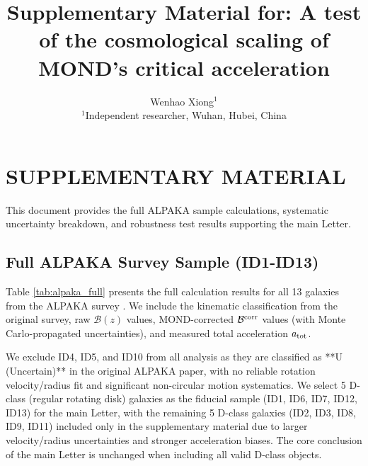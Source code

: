 \documentclass[fleqn,usenatbib]{mnras}
\title[Supplementary Material]
{Supplementary Material for: A test of the cosmological scaling of MOND's critical acceleration}
\author[Wenhao Xiong]{
Wenhao Xiong$^{1}$\\
$^{1}$Independent researcher, Wuhan, Hubei, China
}
\date{}
\begin{document}
\maketitle

\section{SUPPLEMENTARY MATERIAL}
This document provides the full ALPAKA sample calculations, systematic uncertainty breakdown, and robustness test results supporting the main Letter.

\subsection{Full ALPAKA Survey Sample (ID1-ID13)}
Table \ref{tab:alpaka_full} presents the full calculation results for all 13 galaxies from the ALPAKA survey \citep{Rizzo2023}. We include the kinematic classification from the original survey, raw $\mathcal{B}(z)$ values, MOND-corrected $\mathcal{B}^{\rm corr}$ values (with Monte Carlo-propagated uncertainties), and measured total acceleration $a_{\rm tot}$.

We exclude ID4, ID5, and ID10 from all analysis as they are classified as **U (Uncertain)** in the original ALPAKA paper, with no reliable rotation velocity/radius fit and significant non-circular motion systematics. We select 5 D-class (regular rotating disk) galaxies as the fiducial sample (ID1, ID6, ID7, ID12, ID13) for the main Letter, with the remaining 5 D-class galaxies (ID2, ID3, ID8, ID9, ID11) included only in the supplementary material due to larger velocity/radius uncertainties and stronger acceleration biases. The core conclusion of the main Letter is unchanged when including all valid D-class objects.
\end{document}
